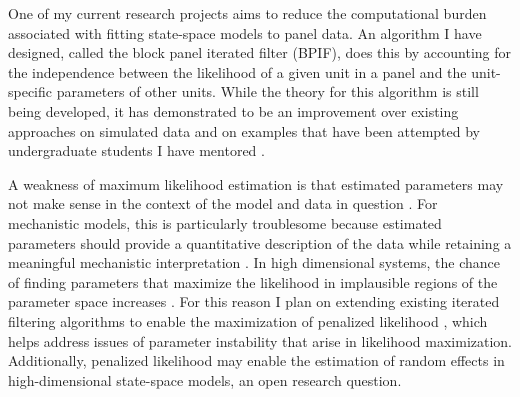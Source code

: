 \documentclass{article}
\begin{document}
One of my current research projects aims to reduce the computational burden associated with fitting state-space models to panel data.
An algorithm I have designed, called the block panel iterated filter (BPIF), does this by accounting for the independence between the likelihood of a given unit in a panel and the unit-specific parameters of other units.
While the theory for this algorithm is still being developed, it has demonstrated to be an improvement over existing approaches on simulated data and on examples that have been attempted by undergraduate students I have mentored \cite{yang23,sun24}.

A weakness of maximum likelihood estimation is that estimated parameters may not make sense in the context of the model and data in question \cite{lecam90}.
For mechanistic models, this is particularly troublesome because estimated parameters should provide a quantitative description of the data while retaining a meaningful mechanistic interpretation \cite{wheeler24}.
In high dimensional systems, the chance of finding parameters that maximize the likelihood in implausible regions of the parameter space increases \cite{li24}.
For this reason I plan on extending existing iterated filtering algorithms \cite{ionides15,ionides22} to enable the maximization of penalized likelihood \cite{cole13}, which helps address issues of parameter instability that arise in likelihood maximization.
Additionally, penalized likelihood may enable the estimation of random effects in high-dimensional state-space models, an open research question.


\end{document}
